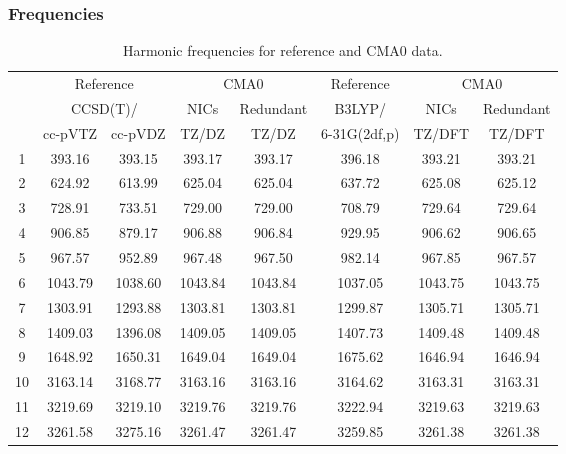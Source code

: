 \documentclass[10pt,oneside]{article}
\begin{document}
\begin{table}[h!]
\subsubsection*{Frequencies}
\centering
\caption{Harmonic frequencies for reference and CMA0 data.}
\begin{tabular}{cccccccc}
\toprule
{} & \multicolumn{2}{c}{Reference} & \multicolumn{2}{c}{CMA0} &    Reference & \multicolumn{2}{c}{CMA0} \\
{} & \multicolumn{2}{c}{CCSD(T)/} &    NICs &  Redundant &       B3LYP/ &    NICs & Redundant \\
{} &   cc-pVTZ & cc-pVDZ &   TZ/DZ &      TZ/DZ & 6-31G(2df,p) &  TZ/DFT &    TZ/DFT \\
\midrule
1  &    393.16 &  393.15 &  393.17 &     393.17 &       396.18 &  393.21 &    393.21 \\
2  &    624.92 &  613.99 &  625.04 &     625.04 &       637.72 &  625.08 &    625.12 \\
3  &    728.91 &  733.51 &  729.00 &     729.00 &       708.79 &  729.64 &    729.64 \\
4  &    906.85 &  879.17 &  906.88 &     906.84 &       929.95 &  906.62 &    906.65 \\
5  &    967.57 &  952.89 &  967.48 &     967.50 &       982.14 &  967.85 &    967.57 \\
6  &   1043.79 & 1038.60 & 1043.84 &    1043.84 &      1037.05 & 1043.75 &   1043.75 \\
7  &   1303.91 & 1293.88 & 1303.81 &    1303.81 &      1299.87 & 1305.71 &   1305.71 \\
8  &   1409.03 & 1396.08 & 1409.05 &    1409.05 &      1407.73 & 1409.48 &   1409.48 \\
9  &   1648.92 & 1650.31 & 1649.04 &    1649.04 &      1675.62 & 1646.94 &   1646.94 \\
10 &   3163.14 & 3168.77 & 3163.16 &    3163.16 &      3164.62 & 3163.31 &   3163.31 \\
11 &   3219.69 & 3219.10 & 3219.76 &    3219.76 &      3222.94 & 3219.63 &   3219.63 \\
12 &   3261.58 & 3275.16 & 3261.47 &    3261.47 &      3259.85 & 3261.38 &   3261.38 \\
\bottomrule
\end{tabular}
\end{table}
\end{document}

